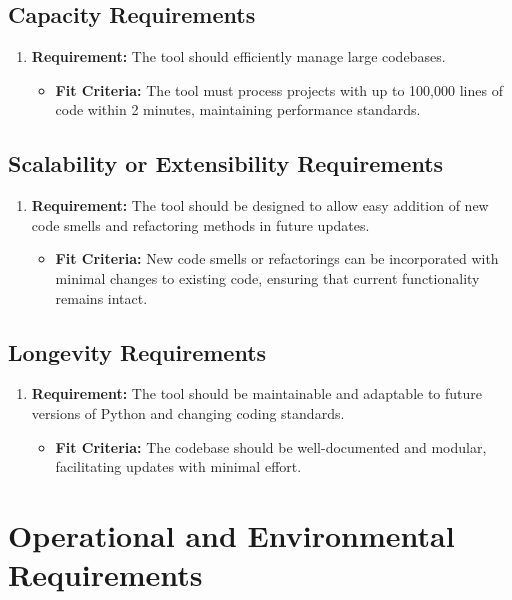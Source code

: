 \documentclass[12pt]{article}
\begin{document}
\subsection{Capacity Requirements}
\begin{enumerate}
  \item \textbf{Requirement:} The tool should efficiently manage large codebases.
  \begin{itemize}[label={}]
      \item \textbf{Fit Criteria:} The tool must process projects with up to 100,000 lines of code within 2 minutes, maintaining performance standards.
  \end{itemize}
\end{enumerate}
\subsection{Scalability or Extensibility Requirements}
\begin{enumerate}
  \item \textbf{Requirement:} The tool should be designed to allow easy addition of new code smells and refactoring methods in future updates.
  \begin{itemize}[label={}]
      \item \textbf{Fit Criteria:}  New code smells or refactorings can be incorporated with minimal changes to existing code, ensuring that current functionality remains intact.
  \end{itemize}
\end{enumerate}
\subsection{Longevity Requirements}
\begin{enumerate}
  \item \textbf{Requirement:} The tool should be maintainable and adaptable to future versions of Python and changing coding standards.
  \begin{itemize}[label={}]
      \item \textbf{Fit Criteria:} The codebase should be well-documented and modular, facilitating updates with minimal effort.
  \end{itemize}
\end{enumerate}

\section{Operational and Environmental Requirements}
\end{document}
